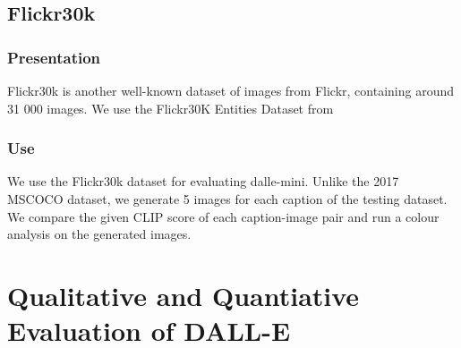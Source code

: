 \documentclass{article}
\begin{document}
\begin{multicols}{2}
\subsection{Flickr30k}

\subsubsection{Presentation}

Flickr30k is another well-known dataset of images from Flickr, containing around 31 000 images.
We use the Flickr30K Entities Dataset from \cite{flickrentitiesijcv}

\subsubsection{Use}

We use the Flickr30k dataset for evaluating dalle-mini. Unlike the 2017 MSCOCO dataset, we generate 5 images for each caption of the testing dataset.
We compare the given CLIP score of each caption-image pair and run a colour analysis on the generated images.

\end{multicols}

\section{Qualitative and Quantiative Evaluation of DALL-E} \label{sec:dalleval}
\end{document}
